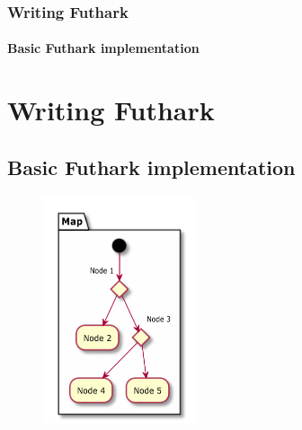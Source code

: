 \documentclass[12pt,t]{beamer}
\begin{document}
\begin{frame}
  \frametitle{Writing Futhark}
  \framesubtitle{Basic Futhark implementation}
\section{Writing Futhark}
\subsection{Basic Futhark implementation}


\begin{figure}
\centering
\includegraphics[width=0.4\textwidth]{tree_basic}
\end{figure}

\end{frame}
\end{document}
